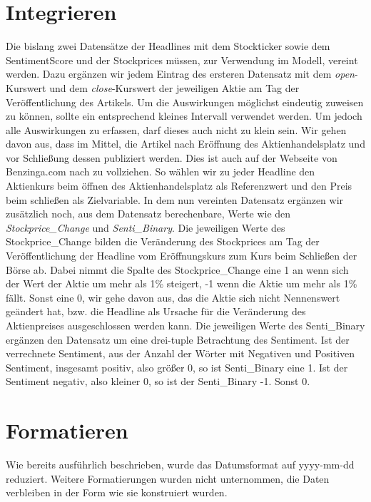\section*{Integrieren}
Die bislang zwei Datensätze der Headlines mit dem Stockticker sowie dem SentimentScore und der Stockprices müssen, zur Verwendung im Modell, vereint werden. Dazu ergänzen wir jedem Eintrag des ersteren Datensatz mit dem \textit{open}-Kurswert und dem \textit{close}-Kurswert der jeweiligen Aktie am Tag der Veröffentlichung des Artikels. Um die Auswirkungen möglichst eindeutig zuweisen zu können, sollte ein entsprechend kleines Intervall verwendet werden. Um jedoch alle Auswirkungen zu erfassen, darf dieses auch nicht zu klein sein. Wir gehen davon aus, dass im Mittel, die Artikel nach Eröffnung des Aktienhandelsplatz und vor Schließung dessen publiziert werden. Dies ist auch auf der Webseite von Benzinga.com nach zu vollziehen. So wählen wir zu jeder Headline den Aktienkurs beim öffnen des Aktienhandelsplatz als Referenzwert und den Preis beim schließen als Zielvariable.  
In dem nun vereinten Datensatz ergänzen wir zusätzlich noch, aus dem Datensatz berechenbare, Werte wie den \textit{Stockprice\_Change} und \textit{Senti\_Binary}. Die jeweiligen Werte des Stockprice\_Change bilden die Veränderung des Stockprices am Tag der Veröffentlichung der Headline vom Eröffnungskurs zum Kurs beim Schließen der Börse ab. Dabei nimmt die Spalte des Stockprice\_Change eine 1 an wenn sich der Wert der Aktie um mehr als 1\% steigert, -1 wenn die Aktie um mehr als 1\% fällt. Sonst eine 0, wir gehe davon aus, das die Aktie sich nicht Nennenswert geändert hat, bzw. die Headline als Ursache für die Veränderung des Aktienpreises ausgeschlossen werden kann. Die jeweiligen Werte des Senti\_Binary ergänzen den Datensatz um eine drei-tuple Betrachtung des Sentiment. Ist der verrechnete Sentiment, aus der Anzahl der Wörter mit Negativen und Positiven Sentiment, insgesamt positiv, also größer 0, so ist Senti\_Binary eine 1. Ist der Sentiment negativ, also kleiner 0, so ist der Senti\_Binary -1. Sonst 0.

\section*{Formatieren}
Wie bereits ausführlich beschrieben, wurde das Datumsformat auf yyyy-mm-dd reduziert. Weitere Formatierungen wurden nicht unternommen, die Daten verbleiben in der Form wie sie konstruiert wurden.

